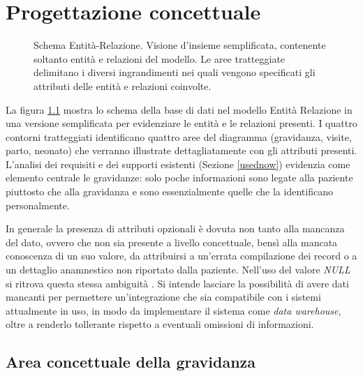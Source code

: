 \chapter{Progettazione concettuale}
\label{conceptual}

\newcommand{\ent}[1]{{\Large #1}}
\newcommand{\card}[1]{{\footnotesize #1}}
\newcommand{\CZU}{\card{(0,1)}}
\newcommand{\CZN}{\card{(0,n)}}
\newcommand{\CUU}{\card{(1,1)}}
\newcommand{\CUN}{\card{(1,n)}}

\begin{figure}
    \centering
    
    \caption{Schema Entità-Relazione. Visione d'insieme semplificata, contenente soltanto entità e relazioni del modello. Le aree tratteggiate delimitano i diversi ingrandimenti nei quali vengono specificati gli attributi delle entità e relazioni coinvolte.}
    \label{completeerdiagram}
\end{figure}

La figura \ref{completeerdiagram} mostra lo schema della base di dati nel modello Entità Relazione in una versione semplificata per evidenziare le entità e le relazioni presenti.
I quattro contorni tratteggiati identificano quattro aree del diagramma (gravidanza, visite, parto, neonato) che verranno illustrate dettagliatamente con gli attributi presenti.
L'analisi dei requisiti e dei supporti esistenti (Sezione \ref{usednow}) evidenzia come elemento centrale le gravidanze: solo poche informazioni sono legate alla paziente piuttosto che alla gravidanza e sono essenzialmente quelle che la identificano personalmente.

In generale la presenza di attributi opzionali è dovuta non tanto alla mancanza del dato, ovvero che non sia presente a livello concettuale, bensì alla mancata conoscenza di un suo valore, da attribuirsi a un'errata compilazione dei record o a un dettaglio anamnestico non riportato dalla paziente.
Nell'uso del valore \emph{NULL} si ritrova questa stessa ambiguità \cite{Sil11}.
Si intende lasciare la possibilità di avere dati mancanti per permettere un'integrazione che sia compatibile con i sistemi attualmente in uso, in modo da implementare il sistema come \emph{data warehouse}, oltre a renderlo tollerante rispetto a eventuali omissioni di informazioni.

\section{Area concettuale della gravidanza}
\label{pregnancyconceptual}

